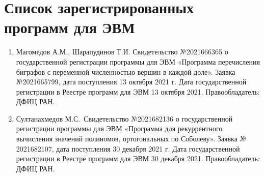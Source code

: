 \section*{Список зарегистрированных программ для ЭВМ}

\begin{enumerate}[1]
    \item
    Магомедов А.М., Шарапудинов Т.И. Свидетельство №2021666365 о государственной регистрации программы для ЭВМ «Программа перечисления биграфов с переменной численностью вершин в каждой доле». Заявка №2021665799, дата поступления 13 октября 2021 г. Дата государственной регистрации в Реестре программ для ЭВМ 13 октября 2021. Правообладатель: ДФИЦ РАН.
    
    \item
    Султанахмедов М.С.~Свидетельство №2021682136 о государственной регистрации программы для ЭВМ «Программа для рекуррентного вычисления значений полиномов, ортогональных по Соболеву». Заявка № 2021682107, дата поступления 30 декабря 2021 г. Дата государственной регистрации в Реестре программ для ЭВМ 30 декабря 2021. Правообладатель: ДФИЦ РАН.
\end{enumerate}
